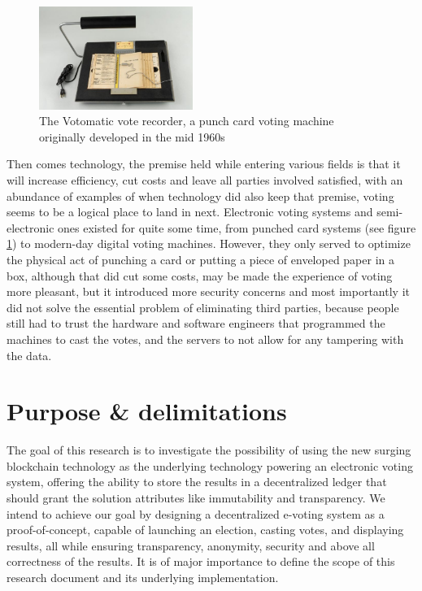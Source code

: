 \begin{figure}
	\vspace{-10pt}
	\includegraphics[width=5cm]{images/chapter1/votomatic.jpg}
	\vspace{-10pt}
	\caption{{\footnotesize The Votomatic vote recorder, a punch card voting machine originally developed in the mid 1960s}}
	\label{votomatic}
\end{figure}

Then comes technology, the premise held while entering various fields is that it will increase efficiency, cut costs and leave all parties involved satisfied, with an abundance of examples of when technology did also keep that premise, voting seems to be a logical place to land in next. Electronic voting systems and semi-electronic ones existed for quite some time, from punched card systems {\small (see figure \ref{votomatic})} to modern-day digital voting machines. However, they only served to optimize the physical act of punching a card or putting a piece of enveloped paper in a box, although that did cut some costs, may be made the experience of voting more pleasant, but it introduced more security concerns and most importantly it did not solve the essential problem of eliminating third parties, because people still had to trust the hardware and software engineers that programmed the machines to cast the votes, and the servers to not allow for any tampering with the data.\newpage


\section{Purpose \& delimitations}
The goal of this research is to investigate the possibility of using the new surging blockchain technology as the underlying technology powering an electronic voting system, offering the ability to store the results in a decentralized ledger that should grant the solution attributes like immutability and transparency. We intend to achieve our goal by designing a decentralized e-voting system as a \gls{proof-of-concept}, capable of launching an election, casting votes, and displaying results, all while ensuring transparency, anonymity, security and above all correctness of the results.
It is of major importance to define the scope of this research document and its underlying implementation.

